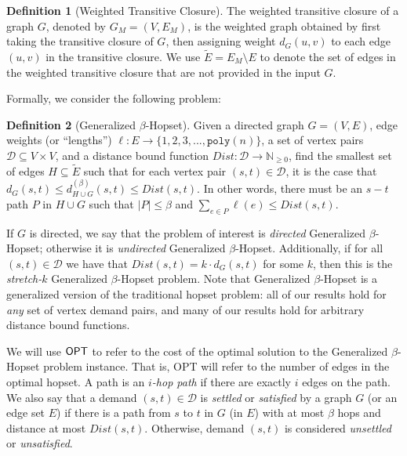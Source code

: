 \documentclass{article}
\theoremstyle{definition}
\newtheorem{definition}{Definition}
\theoremstyle{remark}
\def\be    {\beta}
\def\opt {{\sf OPT}}
\def\hopset {{\sc Generalized $\beta$-Hopset}}
\begin{document}
\begin{definition}[Weighted Transitive Closure] \label{def:trans_closure}
    The weighted transitive closure of a graph $G$, denoted by $G_M = (V, E_M)$, is the weighted graph obtained by first taking the transitive closure of $G$, then assigning weight $d_G(u,v)$ to each edge $(u,v)$ in the transitive closure. We use $\widetilde{E} = E_M \setminus E$ to denote the set of edges in the weighted transitive closure that are not provided in the input $G$. 
\end{definition}


Formally, we consider the following problem:

\begin{definition}[\hopset]\label{def:gen_hopset}
    Given a directed graph $G = (V, E)$, edge weights (or ``lengths'') $\ell : E \rightarrow \{1,2,3,...,\texttt{poly}(n) \}$, a set of vertex pairs $\mathcal D \subseteq V \times V$, and a distance bound function $Dist: \mathcal{D} \rightarrow \mathbb{N}_{\geq 0}$, find the smallest set of edges $H \subseteq \widetilde{E}$ such that for each vertex pair $(s,t) \in \mathcal{D}$, it is the case that $d_G(s,t) \leq d^{(\beta)}_{H \cup G}(s,t) \leq Dist(s,t)$. In other words, there must be an $s-t$ path $P$ in $H \cup G$ such that $|P| \leq \beta$ and $\sum_{e \in P} \ell(e) \leq Dist(s,t)$.
\end{definition} 


If $G$ is directed, we say that the problem of interest is \textit{directed} {\hopset}; otherwise it is \textit{undirected} {\hopset}. Additionally, if for all $(s,t) \in \mathcal{D}$ we have that $Dist(s,t) = k \cdot d_G(s,t)$ for some $k$, then this is the \textit{stretch-$k$} {\hopset} problem. Note that {\hopset} is a generalized version of the traditional hopset problem: all of our results hold for \textit{any} set of vertex demand pairs, and many of our results hold for arbitrary distance bound functions.

We will use ${\opt}$ to refer to the cost of the optimal solution to the {\hopset} problem instance. That is, {\opt} will refer to the number of edges in the optimal hopset. A path is an \textit{$i$-hop path} if there are exactly $i$ edges on the path. We also say that a demand $(s,t) \in \mathcal{D}$ is \textit{settled} or \textit{satisfied} by a graph $G$ (or an edge set $E$) if there is a path from $s$ to $t$ in $G$ (in $E$) with at most $\be$ hops and distance at most $Dist(s,t)$. Otherwise, demand $(s,t)$ is considered \textit{unsettled} or \textit{unsatisfied}. 
\end{document}
